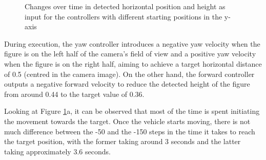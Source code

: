 \begin{figure}[H]
  \centering
  \caption{Changes over time in detected horizontal position and height as input for the controllers with different starting positions in the y-axis}
  \label{fig:validate-yaw}
\end{figure}

During execution, the yaw controller introduces a negative yaw velocity when the figure is on the left half of the camera's field of view and a positive yaw velocity when the figure is on the right half, aiming to achieve a target horizontal distance of 0.5 (centred in the camera image). On the other hand, the forward controller outputs a negative forward velocity to reduce the detected height of the figure from around 0.44 to the target value of 0.36.

Looking at Figure \ref{fig:validate-yaw}a, it can be observed that most of the time is spent initiating the movement towards the target. Once the vehicle starts moving, there is not much difference between the -50 and the -150 steps in the time it takes to reach the target position, with the former taking around 3 seconds and the latter taking approximately 3.6 seconds. 

